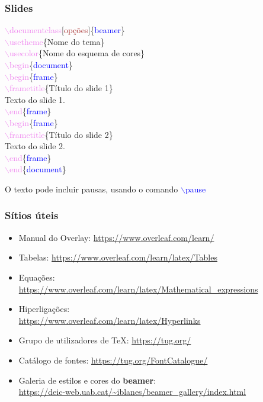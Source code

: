 \documentclass{beamer}
\begin{document}
\begin{frame}
\frametitle{Slides}
\quad\textcolor{violet}{$\backslash$documentclass}[\textcolor{brown}{opções}]\{\textcolor{blue}{beamer}\}\\
\quad\textcolor{violet}{$\backslash$usetheme}\{Nome do tema\}\\
\quad\textcolor{violet}{$\backslash$usecolor}\{Nome do esquema de cores\}\\
\quad\textcolor{violet}{$\backslash$begin}\{\textcolor{blue}{document}\}\\
\qquad\textcolor{violet}{$\backslash$begin}\{\textcolor{blue}{frame}\}\\
\qquad\textcolor{violet}{$\backslash$frametitle}\{Título do slide 1\}\\
\qquad Texto do slide 1.\\
\qquad\textcolor{violet}{$\backslash$end}\{\textcolor{blue}{frame}\}\\
\qquad\textcolor{violet}{$\backslash$begin}\{\textcolor{blue}{frame}\}\\
\qquad\textcolor{violet}{$\backslash$frametitle}\{Título do slide 2\}\\
\qquad Texto do slide 2.\\
\qquad\textcolor{violet}{$\backslash$end}\{\textcolor{blue}{frame}\}\\
\quad\textcolor{violet}{$\backslash$end}\{\textcolor{blue}{document}\}

O texto pode incluir pausas, usando o comando \textcolor{blue}{$\backslash$pause}
\end{frame}
\begin{frame}
\frametitle{Sítios úteis}
\begin{itemize}
\item Manual do Overlay: \url{https://www.overleaf.com/learn/}
\item Tabelas: \url{https://www.overleaf.com/learn/latex/Tables}
\item Equações:\\
  {\small \url{https://www.overleaf.com/learn/latex/Mathematical_expressions}}
\item Hiperligações:\\
  \url{https://www.overleaf.com/learn/latex/Hyperlinks}
\item Grupo de utilizadores de \TeX: \url{https://tug.org/}
\item Catálogo de fontes: \url{https://tug.org/FontCatalogue/}
\item Galeria de estilos e cores do \textbf{beamer}:\\
  {\small \url{https://deic-web.uab.cat/~iblanes/beamer_gallery/index.html}}
\end{itemize}
\end{frame}
\end{document}
